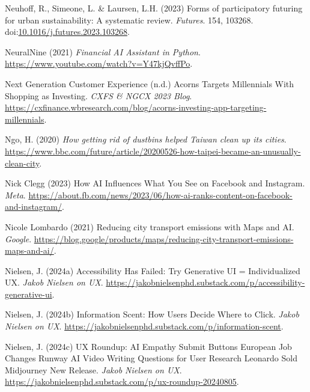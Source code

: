 \documentclass[
  letterpaper,
  DIV=11,
  numbers=noendperiod]{scrartcl}
\newlength{\cslhangindent}
\newenvironment{CSLReferences}[2] %
 {\begin{list}{}{%
  \setlength{\itemindent}{0pt}
  \setlength{\leftmargin}{0pt}
  \setlength{\parsep}{0pt}
  \ifodd #1
   \setlength{\leftmargin}{\cslhangindent}
   \setlength{\itemindent}{-1\cslhangindent}
  \fi
  \setlength{\itemsep}{#2\baselineskip}}}
 {\end{list}}
\begin{document}
\begin{CSLReferences}{0}{1}
Neuhoff, R., Simeone, L. \& Laursen, L.H. (2023) Forms of participatory
futuring for urban sustainability: {A} systematic review.
\emph{Futures}. 154, 103268.
doi:\href{https://doi.org/10.1016/j.futures.2023.103268}{10.1016/j.futures.2023.103268}.

NeuralNine (2021) \emph{Financial {AI Assistant} in {Python}}.
\url{https://www.youtube.com/watch?v=Y47kjQvffPo}.

Next Generation Customer Experience (n.d.) Acorns {Targets Millennials
With Shopping} as {Investing}. \emph{CXFS \& NGCX 2023 Blog}.
\url{https://cxfinance.wbresearch.com/blog/acorns-investing-app-targeting-millennials}.

Ngo, H. (2020) \emph{How getting rid of dustbins helped {Taiwan} clean
up its cities}.
\url{https://www.bbc.com/future/article/20200526-how-taipei-became-an-unusually-clean-city}.

Nick Clegg (2023) How {AI Influences What You See} on {Facebook} and
{Instagram}. \emph{Meta}.
\url{https://about.fb.com/news/2023/06/how-ai-ranks-content-on-facebook-and-instagram/}.

Nicole Lombardo (2021) Reducing city transport emissions with {Maps} and
{AI}. \emph{Google}.
\url{https://blog.google/products/maps/reducing-city-transport-emissions-maps-and-ai/}.

Nielsen, J. (2024a) Accessibility {Has Failed}: {Try Generative UI} =
{Individualized UX}. \emph{Jakob Nielsen on UX}.
\url{https://jakobnielsenphd.substack.com/p/accessibility-generative-ui}.

Nielsen, J. (2024b) Information {Scent}: {How Users Decide Where} to
{Click}. \emph{Jakob Nielsen on UX}.
\url{https://jakobnielsenphd.substack.com/p/information-scent}.

Nielsen, J. (2024c) {UX Roundup}: {AI Empathy} {\textbar} {Submit
Buttons} {\textbar} {European Job Changes} {\textbar} {Runway AI Video}
{\textbar} {Writing Questions} for {User Research} {\textbar} {Leonardo
Sold} {\textbar} {Midjourney New Release}. \emph{Jakob Nielsen on UX}.
\url{https://jakobnielsenphd.substack.com/p/ux-roundup-20240805}.


\end{CSLReferences}
\end{document}

